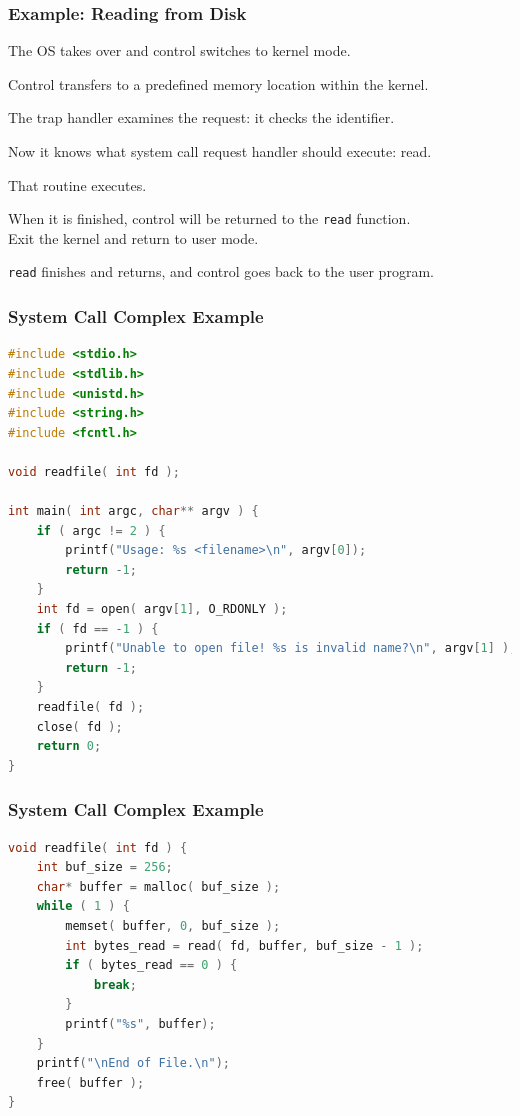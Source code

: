 \begin{frame}
	\frametitle{Example: Reading from Disk}


	The OS takes over and control switches to kernel mode.

	Control transfers to a predefined memory location within the kernel.

	The trap handler examines the request: it checks the identifier.

	Now it knows what system call request handler should execute: read.

	That routine executes.

	When it is finished, control will be returned to the \texttt{read} function.\\
	\quad Exit the kernel and return to user mode.

	\texttt{read} finishes and returns, and control goes back to the user program.


\end{frame}


\begin{frame}[fragile]
	\frametitle{System Call Complex Example}

	\begin{lstlisting}[language=C]
#include <stdio.h>
#include <stdlib.h>
#include <unistd.h>
#include <string.h>
#include <fcntl.h>

void readfile( int fd );

int main( int argc, char** argv ) {
    if ( argc != 2 ) {
        printf("Usage: %s <filename>\n", argv[0]);
        return -1;
    }
    int fd = open( argv[1], O_RDONLY );
    if ( fd == -1 ) {
        printf("Unable to open file! %s is invalid name?\n", argv[1] );
        return -1;
    }
    readfile( fd );
    close( fd );
    return 0;
}
\end{lstlisting}
\end{frame}

\begin{frame}[fragile]
	\frametitle{System Call Complex Example}

	\begin{lstlisting}[language=C]
void readfile( int fd ) {
    int buf_size = 256;
    char* buffer = malloc( buf_size );
    while ( 1 ) {
        memset( buffer, 0, buf_size );
        int bytes_read = read( fd, buffer, buf_size - 1 );  
        if ( bytes_read == 0 ) {
            break; 
        }     
        printf("%s", buffer);
    }
    printf("\nEnd of File.\n");
    free( buffer );
}
\end{lstlisting}


\end{frame}


